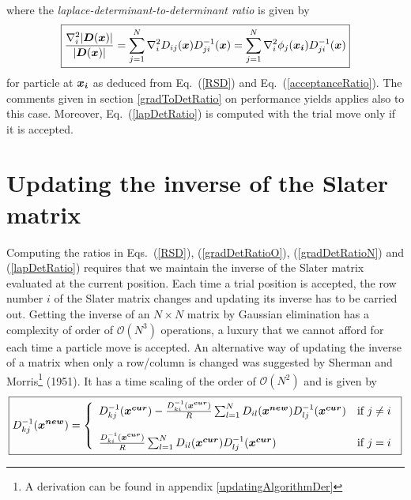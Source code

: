 where the \emph{laplace-determinant-to-determinant ratio} is given by 
\begin{equation}\label{lapDetRatio}
 \boxed{\frac{\nabla_{i}^{2}|\boldsymbol{D}(\boldsymbol{x})|}{|\boldsymbol{D}(\boldsymbol{x})|} = \sum_{j=1}^{N} \nabla_{i}^{2} D_{ij}(\boldsymbol{x}) D_{ji}^{-1}(\boldsymbol{x}) = \sum_{j=1}^{N} \nabla_{i}^{2}\phi_j(\boldsymbol{x_i}) D_{ji}^{-1}(\boldsymbol{x})}
\end{equation}
for particle at $\boldsymbol{x_i}$ as deduced from Eq.~(\ref{RSD}) and Eq.~(\ref{acceptanceRatio}). The comments given in section \ref{gradToDetRatio} on performance yields applies also to this case. Moreover, Eq.~(\ref{lapDetRatio}) is computed with the trial move only if it is accepted.


\section{Updating the inverse of the Slater matrix}
Computing the ratios in Eqs.~(\ref{RSD}), (\ref{gradDetRatioO}), (\ref{gradDetRatioN}) and (\ref{lapDetRatio}) requires that we maintain the inverse of the Slater matrix evaluated at the current position. Each time a trial position is accepted, the row number $i$ of the Slater matrix changes and updating its inverse has to be carried out. Getting the inverse of an $N \times N$ matrix by Gaussian elimination has a complexity of order of $\mathcal{O}(N^3)$ operations, a luxury that we 
cannot afford for each time a particle move is accepted. An alternative way of updating the inverse of a matrix when only a row/column is changed was suggested by Sherman and Morris\footnote{A derivation can be found in appendix \ref{updatingAlgorithmDer}} (1951)\cite{Sherman1950}. It has a time scaling of the order of  $\mathcal{O}(N^2)$ \cite{Hammond, PaulKent, Ceperley_Chester, Williansom} and is given by
\begin{eqnarray}\label{updatingInverse}
\boxed{D^{-1}_{kj}(\boldsymbol{x^{new}})  = \left\{ 
\begin{array}{l l}
  D^{-1}_{kj}(\boldsymbol{x^{cur}}) - \frac{D^{-1}_{ki}(\boldsymbol{x^{cur}})}{R} \sum_{l=1}^{N} D_{il}(\boldsymbol{x^{new}})  D^{-1}_{lj}(\boldsymbol{x^{cur}}) & \mbox{if $j \neq i$}\nonumber \\ \\
 \frac{D^{-1}_{ki}(\boldsymbol{x^{cur}})}{R} \sum_{l=1}^{N} D_{il}(\boldsymbol{x^{cur}}) D^{-1}_{lj}(\boldsymbol{x^{cur}}) & \mbox{if $j=i$}
\end{array} \right.}\\
\end{eqnarray}

